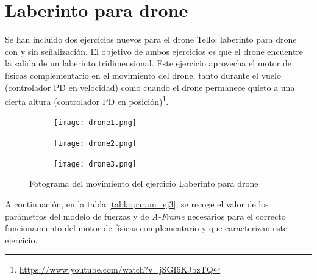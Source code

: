\newpage
\section{Laberinto para drone}
Se han incluido dos ejercicios nuevos para el drone Tello: laberinto para drone con y sin señalización. El objetivo de ambos ejercicios es que el drone encuentre la salida de un laberinto tridimensional. Este ejercicio aprovecha el motor de físicas complementario en el movimiento del drone, tanto durante el vuelo (controlador PD en velocidad) como cuando el drone permanece quieto a una cierta altura (controlador PD en posición)\footnote{\url{https://www.youtube.com/watch?v=jSGI6KJbzTQ}}. \newline

\begin{figure}[h!]
\begin{subfigure}[b]{0.3\textwidth}
    \texttt{[image: drone1.png]}
  \end{subfigure}
  \hfill
  \hfill
  \begin{subfigure}[b]{0.3\textwidth}
    \texttt{[image: drone2.png]}
  \end{subfigure}
    \hfill
    \hfill
  \begin{subfigure}[b]{0.3\textwidth}
    \texttt{[image: drone3.png]}
  \end{subfigure}
    \hfill
    \caption{Fotograma del movimiento del ejercicio Laberinto para drone}
    \label{fig:laberinto_drone_movimiento}
\end{figure}

A continuación, en la tabla \ref{tabla:param_ej3}, se recoge el valor de los parámetros del modelo de fuerzas y de  \textit{A-Frame} necesarios para el correcto funcionamiento del motor de físicas complementario y que caracterizan este ejercicio.

